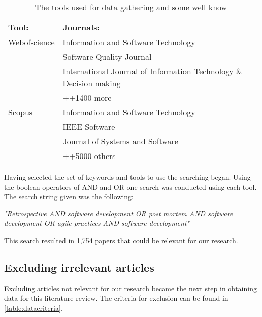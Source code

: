 \documentclass{article}
\begin{document}
\begin{table}[!h]
	\begin{center}
		\begin{tabular}{ l | p{}}
			Tool: & Journals: \\ \hline
			Webofscience & Information and Software Technology \\ 
			& Software Quality Journal \\
			& International Journal of Information Technology \& Decision making \\
			& ++1400 more \\
			\hline
			Scopus & Information and Software Technology \\ 
			& IEEE Software\\
			& Journal of Systems and Software \\
			& ++5000 others \\
		\end{tabular}
		\caption{The tools used for data gathering and some well know}
		\label{table:tools}
	\end{center}
\end{table}

Having selected the set of keywords and tools to use the searching began. Using the boolean operators of AND and OR one search was conducted using each tool. The search string given was the following: 
\begin{center}
	\emph{"Retrospective AND software development OR post mortem AND software development OR agile practices AND software development"}
\end{center}
This search resulted in 1,754 papers that could be relevant for our research.

\subsection{Excluding irrelevant articles}
Excluding articles not relevant for our research became the next step in obtaining data for this literature review. The criteria for exclusion can be found in \autoref{table:datacriteria}. \\
\end{document}
